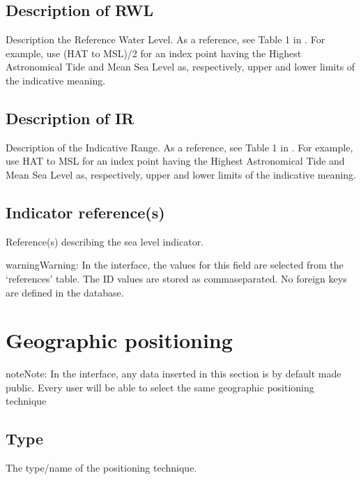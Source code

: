 \documentclass[letterpaper,10pt,english]{sphinxmanual}
\begin{document}
\subsection{Description of RWL}
\label{\detokenize{Metadata:description-of-rwl}}
Description the Reference Water Level. As a reference, see Table 1 in . For example, use (HAT to MSL)/2 for an index point having the Highest Astronomical Tide and Mean Sea Level as, respectively, upper and lower limits of the indicative meaning.


\subsection{Description of IR}
\label{\detokenize{Metadata:description-of-ir}}
Description of the Indicative Range. As a reference, see Table 1 in . For example, use HAT to MSL for an index point having the Highest Astronomical Tide and Mean Sea Level as, respectively, upper and lower limits of the indicative meaning.


\subsection{Indicator reference(s)}
\label{\detokenize{Metadata:indicator-reference-s}}
Reference(s) describing the sea level indicator.

\begin{sphinxadmonition}{warning}{Warning:}
In the interface, the values for this field are selected from the ‘references’ table. The ID values are stored as comma\sphinxhyphen{}separated. No foreign keys are defined in the database.
\end{sphinxadmonition}


\section{Geographic positioning}
\label{\detokenize{Metadata:geographic-positioning}}
\begin{sphinxadmonition}{note}{Note:}
In the interface, any data inserted in this section is by default made public. Every user will be able to select the same geographic positioning technique
\end{sphinxadmonition}


\subsection{Type}
\label{\detokenize{Metadata:type}}
The type/name of the positioning technique.
\end{document}

